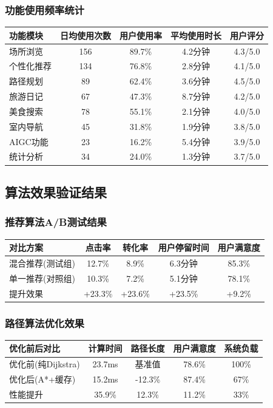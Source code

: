 \documentclass[12pt,a4paper]{article}
\begin{document}
\subsubsection{功能使用频率统计}
\begin{center}
\begin{tabular}{|l|c|c|c|c|}
\hline
\textbf{功能模块} & \textbf{日均使用次数} & \textbf{用户使用率} & \textbf{平均使用时长} & \textbf{用户评分} \\
\hline
场所浏览 & 156 & 89.7\% & 4.2分钟 & 4.3/5.0 \\
个性化推荐 & 134 & 76.8\% & 2.8分钟 & 4.1/5.0 \\
路径规划 & 89 & 62.4\% & 3.6分钟 & 4.5/5.0 \\
旅游日记 & 67 & 47.3\% & 8.7分钟 & 4.2/5.0 \\
美食搜索 & 78 & 55.1\% & 2.1分钟 & 4.0/5.0 \\
室内导航 & 45 & 31.8\% & 1.9分钟 & 3.8/5.0 \\
AIGC功能 & 23 & 16.2\% & 5.4分钟 & 3.9/5.0 \\
统计分析 & 34 & 24.0\% & 1.3分钟 & 3.7/5.0 \\
\hline
\end{tabular}
\end{center}

\subsection{算法效果验证结果}
\subsubsection{推荐算法A/B测试结果}
\begin{center}
\begin{tabular}{|l|c|c|c|c|}
\hline
\textbf{对比方案} & \textbf{点击率} & \textbf{转化率} & \textbf{用户停留时间} & \textbf{用户满意度} \\
\hline
混合推荐(测试组) & 12.7\% & 8.9\% & 6.3分钟 & 85.3\% \\
单一推荐(对照组) & 10.3\% & 7.2\% & 5.1分钟 & 78.1\% \\
提升效果 & +23.3\% & +23.6\% & +23.5\% & +9.2\% \\
\hline
\end{tabular}
\end{center}

\subsubsection{路径算法优化效果}
\begin{center}
\begin{tabular}{|l|c|c|c|c|}
\hline
\textbf{优化前后对比} & \textbf{计算时间} & \textbf{路径长度} & \textbf{用户满意度} & \textbf{系统负载} \\
\hline
优化前(纯Dijkstra) & 23.7ms & 基准值 & 78.6\% & 100\% \\
优化后(A*+缓存) & 15.2ms & -12.3\% & 87.4\% & 67\% \\
性能提升 & 35.9\% & 12.3\% & 11.2\% & 33\% \\
\hline
\end{tabular}
\end{center}
\end{document}
